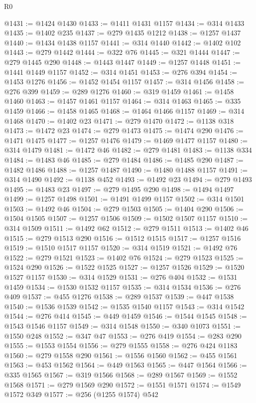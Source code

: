 \begin{lexlean}{R0}
\begin{coremodule}
@1431 := @1424 @1430
@1433 := @1411 @1431 @1157
@1434 := @314 @1433
@1435 := @1402 @235
@1437 := @279 @1435 @1212
@1438 := @1257 @1437
@1440 := @1434 @1438 @1157
@1441 := @314 @1440
@1442 := @1402 @102
@1443 := @279 @1442
@1444 := @322 @76
@1445 := @321 @1444
@1447 := @279 @1445 @290
@1448 := @1443 @1447
@1449 := @1257 @1448
@1451 := @1441 @1449 @1157
@1452 := @314 @1451
@1453 := @276 @394
@1454 := @1453 @1276
@1456 := @1452 @1454 @1157
@1457 := @314 @1456
@1458 := @276 @399
@1459 := @289 @1276
@1460 := @319 @1459
@1461 := @1458 @1460
@1463 := @1457 @1461 @1157
@1464 := @314 @1463
@1465 := @335 @1459
@1466 := @1458 @1465
@1468 := @1464 @1466 @1157
@1469 := @314 @1468
@1470 := @1402 @23
@1471 := @279 @1470
@1472 := @1138 @318
@1473 := @1472 @23
@1474 := @279 @1473
@1475 := @1474 @290
@1476 := @1471 @1475
@1477 := @1257 @1476
@1479 := @1469 @1477 @1157
@1480 := @314 @1479
@1481 := @1472 @46
@1482 := @279 @1481
@1483 := @1138 @334
@1484 := @1483 @46
@1485 := @279 @1484
@1486 := @1485 @290
@1487 := @1482 @1486
@1488 := @1257 @1487
@1490 := @1480 @1488 @1157
@1491 := @314 @1490
@1492 := @1138 @452
@1493 := @1492 @23
@1494 := @279 @1493
@1495 := @1483 @23
@1497 := @279 @1495 @290
@1498 := @1494 @1497
@1499 := @1257 @1498
@1501 := @1491 @1499 @1157
@1502 := @314 @1501
@1503 := @1492 @46
@1504 := @279 @1503
@1505 := @1404 @290
@1506 := @1504 @1505
@1507 := @1257 @1506
@1509 := @1502 @1507 @1157
@1510 := @314 @1509
@1511 := @1492 @62
@1512 := @279 @1511
@1513 := @1402 @46
@1515 := @279 @1513 @290
@1516 := @1512 @1515
@1517 := @1257 @1516
@1519 := @1510 @1517 @1157
@1520 := @314 @1519
@1521 := @1492 @76
@1522 := @279 @1521
@1523 := @1402 @76
@1524 := @279 @1523
@1525 := @1524 @290
@1526 := @1522 @1525
@1527 := @1257 @1526
@1529 := @1520 @1527 @1157
@1530 := @314 @1529
@1531 := @276 @404
@1532 := @1531 @1459
@1534 := @1530 @1532 @1157
@1535 := @314 @1534
@1536 := @276 @409
@1537 := @455 @1276
@1538 := @289 @1537
@1539 := @447 @1538
@1540 := @1536 @1539
@1542 := @1535 @1540 @1157
@1543 := @314 @1542
@1544 := @276 @414
@1545 := @449 @1459
@1546 := @1544 @1545
@1548 := @1543 @1546 @1157
@1549 := @314 @1548
@1550 := @340 @1073
@1551 := @1550 @248
@1552 := @347 @47
@1553 := @276 @419
@1554 := @283 @290
@1555 := @1553 @1554
@1556 := @279 @1555
@1558 := @276 @424 @1183
@1560 := @279 @1558 @290
@1561 := @1556 @1560
@1562 := @455 @1561
@1563 := @453 @1562
@1564 := @449 @1563
@1565 := @447 @1564
@1566 := @335 @1565
@1567 := @319 @1566
@1568 := @289 @1567
@1569 := @1552 @1568
@1571 := @279 @1569 @290
@1572 := @1551 @1571
@1574 := @1549 @1572 @349
@1577 := @256 (@1255 @1574) @542

\end{coremodule}
\end{lexlean}

